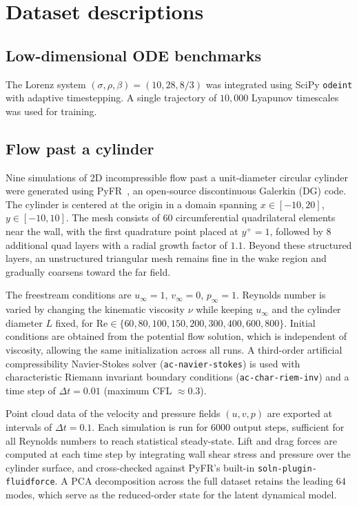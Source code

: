 \documentclass[12pt]{article}
\begin{document}
\section{Dataset descriptions}
\label{app:datasets}

\subsection{Low-dimensional ODE benchmarks}
The Lorenz system $(\sigma, \rho, \beta) = (10, 28, 8/3)$ was integrated using SciPy \texttt{odeint} with adaptive timestepping. A single trajectory of $10{,}000$ Lyapunov timescales was used for training.

\subsection{Flow past a cylinder}
\label{app:cylinder_dataset}

Nine simulations of 2D incompressible flow past a unit-diameter circular cylinder were generated using PyFR~\cite{witherden2014pyfr}, an open-source discontinuous Galerkin (DG) code. The cylinder is centered at the origin in a domain spanning $x \in [-10, 20]$, $y \in [-10, 10]$. The mesh consists of $60$ circumferential quadrilateral elements near the wall, with the first quadrature point placed at $y^+ = 1$, followed by $8$ additional quad layers with a radial growth factor of $1.1$. Beyond these structured layers, an unstructured triangular mesh remains fine in the wake region and gradually coarsens toward the far field.

The freestream conditions are $u_\infty = 1$, $v_\infty = 0$, $p_\infty = 1$. Reynolds number is varied by changing the kinematic viscosity $\nu$ while keeping $u_\infty$ and the cylinder diameter $L$ fixed, for $\mathrm{Re} \in \{60, 80, 100, 150, 200, 300, 400, 600, 800\}$. Initial conditions are obtained from the potential flow solution, which is independent of viscosity, allowing the same initialization across all runs. A third-order artificial compressibility Navier-Stokes solver (\texttt{ac-navier-stokes}) is used with characteristic Riemann invariant boundary conditions (\texttt{ac-char-riem-inv}) and a time step of $\Delta t = 0.01$ (maximum CFL $\approx 0.3$).

Point cloud data of the velocity and pressure fields $(u, v, p)$ are exported at intervals of $\Delta t = 0.1$. Each simulation is run for $6000$ output steps, sufficient for all Reynolds numbers to reach statistical steady-state. Lift and drag forces are computed at each time step by integrating wall shear stress and pressure over the cylinder surface, and cross-checked against PyFR's built-in \texttt{soln-plugin-fluidforce}. A PCA decomposition across the full dataset retains the leading $64$ modes, which serve as the reduced-order state for the latent dynamical model.
\end{document}
